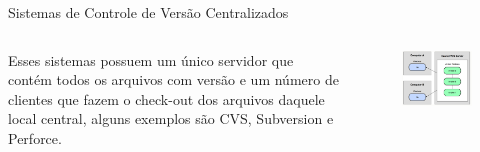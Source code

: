 \documentclass[12pt]{beamer}
\begin{document}
\begin{frame}{Sistemas de Controle de Versão Centralizados}
	\begin{columns}
	    \begin{column}{0.5\textwidth}  %
	      \begin{center}
	      		\justifying
		 		 Esses sistemas possuem um único servidor que contém todos os arquivos com versão e um número de clientes que fazem o check-out dos arquivos daquele local central, alguns exemplos são CVS, Subversion e Perforce.
			\end{center}
	    \end{column}\begin{column}{0.5\textwidth}
			\begin{figure}[!htb]
      		\centering
            \includegraphics[scale=0.4]{figuras/fig6.png} 
         \end{figure}
	    \end{column}
	    
	\end{columns}
\end{frame}
\end{document}
